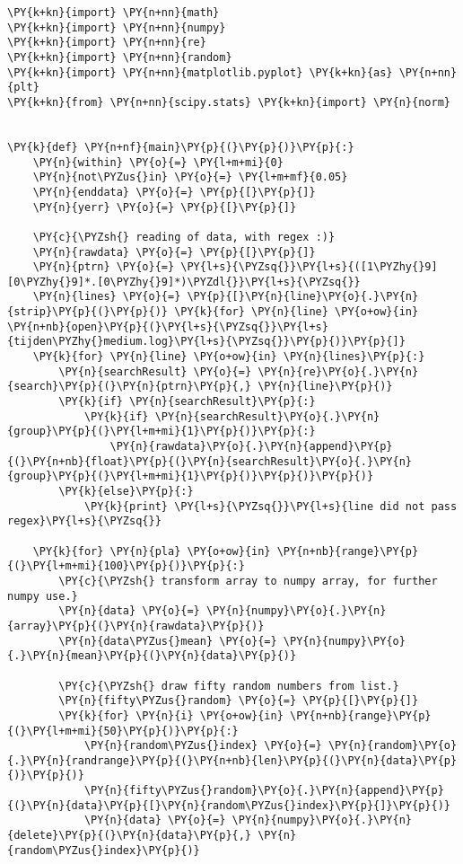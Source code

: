 \begin{Verbatim}[commandchars=\\\{\}]
\PY{k+kn}{import} \PY{n+nn}{math}
\PY{k+kn}{import} \PY{n+nn}{numpy}
\PY{k+kn}{import} \PY{n+nn}{re}
\PY{k+kn}{import} \PY{n+nn}{random}
\PY{k+kn}{import} \PY{n+nn}{matplotlib.pyplot} \PY{k+kn}{as} \PY{n+nn}{plt}
\PY{k+kn}{from} \PY{n+nn}{scipy.stats} \PY{k+kn}{import} \PY{n}{norm}


\PY{k}{def} \PY{n+nf}{main}\PY{p}{(}\PY{p}{)}\PY{p}{:}
    \PY{n}{within} \PY{o}{=} \PY{l+m+mi}{0}
    \PY{n}{not\PYZus{}in} \PY{o}{=} \PY{l+m+mf}{0.05}
    \PY{n}{enddata} \PY{o}{=} \PY{p}{[}\PY{p}{]}
    \PY{n}{yerr} \PY{o}{=} \PY{p}{[}\PY{p}{]}

    \PY{c}{\PYZsh{} reading of data, with regex :)}
    \PY{n}{rawdata} \PY{o}{=} \PY{p}{[}\PY{p}{]}
    \PY{n}{ptrn} \PY{o}{=} \PY{l+s}{\PYZsq{}}\PY{l+s}{([1\PYZhy{}9][0\PYZhy{}9]*.[0\PYZhy{}9]*)\PYZdl{}}\PY{l+s}{\PYZsq{}}
    \PY{n}{lines} \PY{o}{=} \PY{p}{[}\PY{n}{line}\PY{o}{.}\PY{n}{strip}\PY{p}{(}\PY{p}{)} \PY{k}{for} \PY{n}{line} \PY{o+ow}{in} \PY{n+nb}{open}\PY{p}{(}\PY{l+s}{\PYZsq{}}\PY{l+s}{tijden\PYZhy{}medium.log}\PY{l+s}{\PYZsq{}}\PY{p}{)}\PY{p}{]}
    \PY{k}{for} \PY{n}{line} \PY{o+ow}{in} \PY{n}{lines}\PY{p}{:}
        \PY{n}{searchResult} \PY{o}{=} \PY{n}{re}\PY{o}{.}\PY{n}{search}\PY{p}{(}\PY{n}{ptrn}\PY{p}{,} \PY{n}{line}\PY{p}{)}
        \PY{k}{if} \PY{n}{searchResult}\PY{p}{:}
            \PY{k}{if} \PY{n}{searchResult}\PY{o}{.}\PY{n}{group}\PY{p}{(}\PY{l+m+mi}{1}\PY{p}{)}\PY{p}{:}
                \PY{n}{rawdata}\PY{o}{.}\PY{n}{append}\PY{p}{(}\PY{n+nb}{float}\PY{p}{(}\PY{n}{searchResult}\PY{o}{.}\PY{n}{group}\PY{p}{(}\PY{l+m+mi}{1}\PY{p}{)}\PY{p}{)}\PY{p}{)}
        \PY{k}{else}\PY{p}{:}
            \PY{k}{print} \PY{l+s}{\PYZsq{}}\PY{l+s}{line did not pass regex}\PY{l+s}{\PYZsq{}}

    \PY{k}{for} \PY{n}{pla} \PY{o+ow}{in} \PY{n+nb}{range}\PY{p}{(}\PY{l+m+mi}{100}\PY{p}{)}\PY{p}{:}
        \PY{c}{\PYZsh{} transform array to numpy array, for further numpy use.}
        \PY{n}{data} \PY{o}{=} \PY{n}{numpy}\PY{o}{.}\PY{n}{array}\PY{p}{(}\PY{n}{rawdata}\PY{p}{)}
        \PY{n}{data\PYZus{}mean} \PY{o}{=} \PY{n}{numpy}\PY{o}{.}\PY{n}{mean}\PY{p}{(}\PY{n}{data}\PY{p}{)}

        \PY{c}{\PYZsh{} draw fifty random numbers from list.}
        \PY{n}{fifty\PYZus{}random} \PY{o}{=} \PY{p}{[}\PY{p}{]}
        \PY{k}{for} \PY{n}{i} \PY{o+ow}{in} \PY{n+nb}{range}\PY{p}{(}\PY{l+m+mi}{50}\PY{p}{)}\PY{p}{:}
            \PY{n}{random\PYZus{}index} \PY{o}{=} \PY{n}{random}\PY{o}{.}\PY{n}{randrange}\PY{p}{(}\PY{n+nb}{len}\PY{p}{(}\PY{n}{data}\PY{p}{)}\PY{p}{)}
            \PY{n}{fifty\PYZus{}random}\PY{o}{.}\PY{n}{append}\PY{p}{(}\PY{n}{data}\PY{p}{[}\PY{n}{random\PYZus{}index}\PY{p}{]}\PY{p}{)}
            \PY{n}{data} \PY{o}{=} \PY{n}{numpy}\PY{o}{.}\PY{n}{delete}\PY{p}{(}\PY{n}{data}\PY{p}{,} \PY{n}{random\PYZus{}index}\PY{p}{)}


\end{Verbatim}
